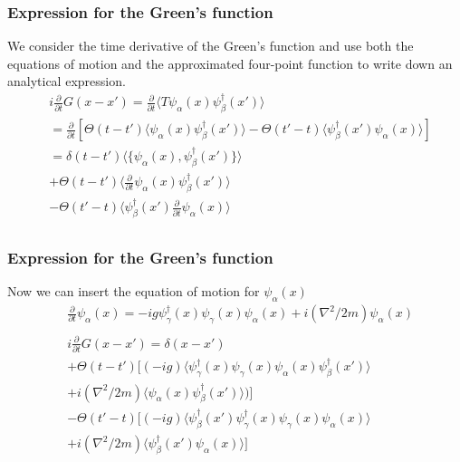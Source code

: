 \documentclass{beamer}
\begin{document}
\begin{frame}
\frametitle{Expression for the Green's function}

We consider the time derivative of the Green's function and use both the equations of motion and the approximated four-point function to write down an analytical expression.
\begin{eqnarray*}
& i\frac{\partial}{\partial t} G(x-x') = \frac{\partial}{\partial t}\langle T\psi_{\alpha}(x) \psi_{\beta}^{\dagger}(x')\rangle \\
&= \frac{\partial}{\partial t} \left[\Theta(t-t')\langle\psi_{\alpha}(x) \psi_{\beta}^{\dagger}(x')\rangle - \Theta(t'-t)\langle \psi_{\beta}^{\dagger}(x')\psi_{\alpha}(x)\rangle\right]  \\
& = \delta(t-t')\langle\{\psi_{\alpha}(x), \psi_{\beta}^{\dagger}(x')\}\rangle\\
& + \Theta(t-t') \langle \frac{\partial}{\partial t}\psi_{\alpha}(x) \psi_{\beta}^{\dagger}(x')\rangle \\
& - \Theta(t'-t) \langle \psi_{\beta}^{\dagger}(x')\frac{\partial}{\partial t}\psi_{\alpha}(x)\rangle \\
\end{eqnarray*}

\end{frame}

\begin{frame}
\frametitle{Expression for the Green's function}
Now we can insert the equation of motion for $\psi_{\alpha}(x)$
\begin{eqnarray*}
& \frac{\partial}{\partial t}\psi_{\alpha}(x) = -ig\psi_{\gamma}^{\dagger}(x)\psi_{\gamma}(x)\psi_{\alpha}(x) +i(\nabla^2 /2m)\psi_{\alpha}(x) \\
\\
& i\frac{\partial}{\partial t} G(x-x') = \delta(x - x') \\
& + \Theta(t-t') \big[(-ig)\langle\psi_{\gamma}^{\dagger}(x)\psi_{\gamma}(x) \psi_{\alpha}(x) \psi_{\beta}^{\dagger}(x')\rangle \\
& +i(\nabla^2 /2m)\langle\psi_{\alpha}(x)\psi_{\beta}^{\dagger}(x')\rangle)\big] \\
& - \Theta(t'-t)\big[(-ig) \langle \psi_{\beta}^{\dagger}(x')\psi_{\gamma}^{\dagger}(x)\psi_{\gamma}(x) \psi_{\alpha}(x)\rangle \\
& +i(\nabla^2 /2m)\langle\psi_{\beta}^{\dagger}(x')\psi_{\alpha}(x)\rangle\big]
\end{eqnarray*}
\end{frame}
\end{document}
